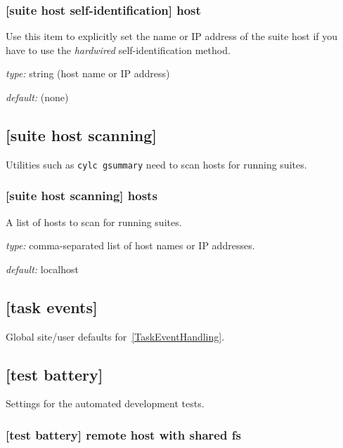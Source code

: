 \subsubsection[host]{[suite host self-identification] \textrightarrow host }

Use this item to explicitly set the name or IP address of the suite host
if you have to use the {\em hardwired} self-identification method.
\begin{myitemize}
\item {\em type:} string (host name or IP address)
\item {\em default:} (none)
\end{myitemize}

\subsection{[suite host scanning]}

Utilities such as \lstinline=cylc gsummary= need to scan hosts for
running suites.

\subsubsection[hosts]{[suite host scanning] \textrightarrow hosts }

A list of hosts to scan for running suites.
\begin{myitemize}
\item {\em type:} comma-separated list of host names or IP addresses.
\item {\em default:} localhost
\end{myitemize}

\subsection{[task events]}

Global site/user defaults for~\ref{TaskEventHandling}.

\subsection{[test battery]}

Settings for the automated development tests.

\subsubsection[remote host with shared fs]{[test battery] \textrightarrow remote host with shared fs}

